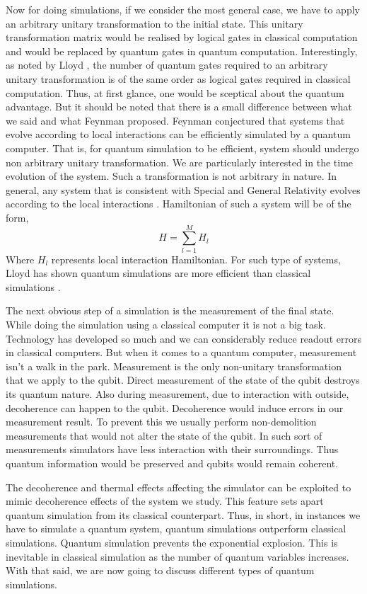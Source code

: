 \documentclass[12pt,a4paper]{report}
\begin{document}
Now for doing simulations, if we consider the most general case, we have to apply an arbitrary unitary transformation to the initial state. This unitary transformation matrix would be realised by logical gates in classical computation and would be replaced by quantum gates in quantum computation. Interestingly, as noted by Lloyd \cite{lloyd}, the number of quantum gates required to an arbitrary unitary transformation is of the same order as logical gates required in classical computation. Thus, at first glance, one would be sceptical about the quantum advantage. But it should be noted that there is a small difference between what we said and what Feynman proposed. Feynman conjectured that systems that evolve according to local interactions can be efficiently simulated by a quantum computer. That is, for quantum simulation to be efficient, system should undergo non arbitrary unitary transformation.  We are particularly interested in the time evolution of the system. Such a transformation is not arbitrary in nature. In general, any system that is consistent with Special and General Relativity evolves according to the local interactions \cite{lloyd}. Hamiltonian of such a system will be of the form,
\begin{equation}
H= \sum_{l=1}^{M} H_{l}
\end{equation}
Where $H_{l}$ represents local interaction Hamiltonian. For such type of systems, Lloyd has shown quantum simulations are more efficient than classical simulations \cite{lloyd}.

The next obvious step of a simulation is the measurement of the final state. While doing the simulation using a classical computer it is not a big task. Technology has developed so much and we can considerably reduce readout errors in classical computers. But when it comes to a quantum computer, measurement isn’t a walk in the park. Measurement is the only non-unitary transformation that we apply to the qubit.  Direct measurement of the state of the qubit destroys its quantum nature.  Also during measurement, due to interaction with outside, decoherence can happen to the qubit. Decoherence would induce errors in our measurement result. To prevent this we usually perform non-demolition measurements that would not alter the state of the qubit. In such sort of measurements simulators have less interaction with their surroundings. Thus quantum information would be preserved and qubits would remain coherent. 

The decoherence and thermal effects affecting the simulator can be exploited to mimic decoherence effects of the system we study. This feature sets apart quantum simulation from its classical counterpart. Thus, in short, in instances we have to simulate a quantum system, quantum simulations outperform classical simulations. Quantum simulation prevents the exponential explosion. This is inevitable in classical simulation as the number of quantum variables increases. With that said, we are now going to discuss different types of quantum simulations.
\end{document}
